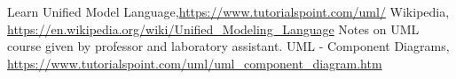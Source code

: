 \begin{thebibliography}{99999}
\singlespace\normalsize

 Learn Unified Model Language,\url{https://www.tutorialspoint.com/uml/}
 Wikipedia, \url{https://en.wikipedia.org/wiki/Unified_Modeling_Language}
 Notes on UML course given by professor and laboratory assistant.
UML - Component Diagrams, \url{https://www.tutorialspoint.com/uml/uml_component_diagram.htm}




\end{thebibliography}
